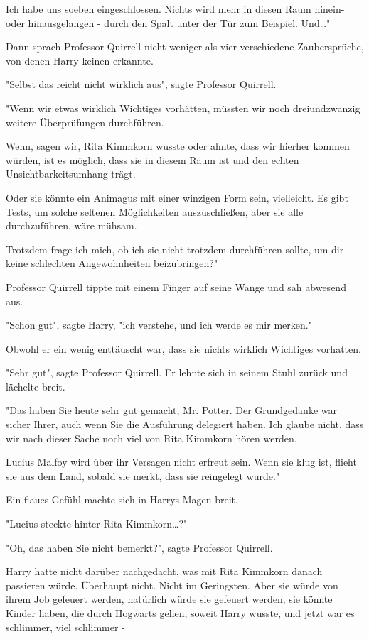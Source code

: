 {Ich habe uns soeben eingeschlossen. Nichts wird mehr in diesen Raum hinein- oder hinausgelangen - durch den Spalt unter der Tür zum Beispiel. Und…"

Dann sprach Professor Quirrell nicht weniger als vier verschiedene Zaubersprüche, von denen Harry keinen erkannte.

"Selbst das reicht nicht wirklich aus", sagte Professor Quirrell.

"Wenn wir etwas wirklich Wichtiges vorhätten, müssten wir noch dreiundzwanzig weitere Überprüfungen durchführen.

Wenn, sagen wir, Rita Kimmkorn wusste oder ahnte, dass wir hierher kommen würden, ist es möglich, dass sie in diesem Raum ist und den echten Unsichtbarkeitsumhang trägt.

Oder sie könnte ein Animagus mit einer winzigen Form sein, vielleicht. Es gibt Tests, um solche seltenen Möglichkeiten auszuschließen, aber sie alle durchzuführen, wäre mühsam.

Trotzdem frage ich mich, ob ich sie nicht trotzdem durchführen sollte, um dir keine schlechten Angewohnheiten beizubringen?"

Professor Quirrell tippte mit einem Finger auf seine Wange und sah abwesend aus.

"Schon gut", sagte Harry, "ich verstehe, und ich werde es mir merken."

Obwohl er ein wenig enttäuscht war, dass sie nichts wirklich Wichtiges vorhatten.

"Sehr gut", sagte Professor Quirrell. Er lehnte sich in seinem Stuhl zurück und lächelte breit.

"Das haben Sie heute sehr gut gemacht, Mr. Potter. Der Grundgedanke war sicher Ihrer, auch wenn Sie die Ausführung delegiert haben. Ich glaube nicht, dass wir nach dieser Sache noch viel von Rita Kimmkorn hören werden.

Lucius Malfoy wird über ihr Versagen nicht erfreut sein. Wenn sie klug ist, flieht sie aus dem Land, sobald sie merkt, dass sie reingelegt wurde."

Ein flaues Gefühl machte sich in Harrys Magen breit.

"Lucius steckte hinter Rita Kimmkorn…?"

"Oh, das haben Sie nicht bemerkt?", sagte Professor Quirrell.

Harry hatte nicht darüber nachgedacht, was mit Rita Kimmkorn danach passieren würde. Überhaupt nicht. Nicht im Geringsten. Aber sie würde von ihrem Job gefeuert werden, natürlich würde sie gefeuert werden, sie könnte Kinder haben, die durch Hogwarts gehen, soweit Harry wusste, und jetzt war es schlimmer, viel schlimmer -

}
